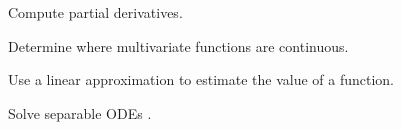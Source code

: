 \begin{readinessAssuranceOutcomes}
\item Compute partial derivatives.
\item Determine where multivariate functions are continuous.
\item Use a linear approximation to estimate the value of a  function.
\item Solve separable ODEs .
\end{readinessAssuranceOutcomes}
